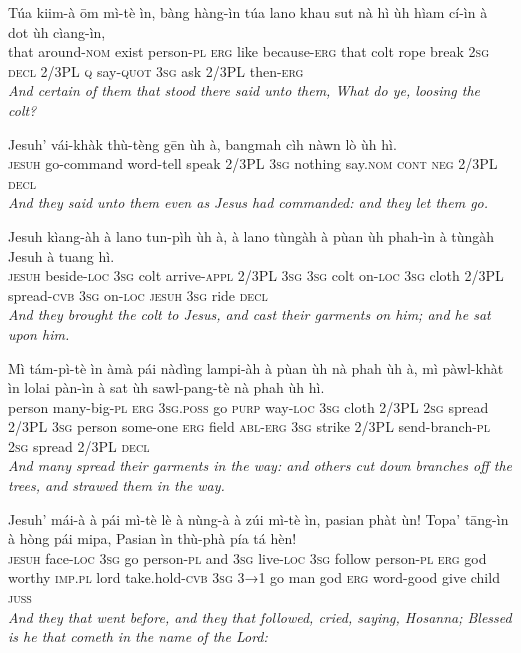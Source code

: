\documentclass[11pt,a4paper]{article}
\begin{document}
\begin{exe}
\gll Túa kiim-à ōm mì-tè ìn, bàng hàng-ìn túa lano khau sut nà hì ùh hìam cí-ìn à dot ùh cìang-ìn, \\
     that around-\textsc{nom} exist person-\textsc{pl} \textsc{erg} like because-\textsc{erg} that colt rope break \textsc{2sg} \textsc{decl} 2/3PL \textsc{q} say-\textsc{quot} \textsc{3sg} ask 2/3PL then-\textsc{erg} \\
\glt \textcolor{kjvcolor}{\textit{And certain of them that stood there said unto them, What do ye, loosing the colt?}}

\gll Jesuh' vái-khàk thù-tèng gēn ùh à, bangmah cìh nàwn lò ùh hì. \\
     \textsc{jesuh} go-command word-tell speak 2/3PL \textsc{3sg} nothing say.\textsc{nom} \textsc{cont} \textsc{neg} 2/3PL \textsc{decl} \\
\glt \textcolor{kjvcolor}{\textit{And they said unto them even as Jesus had commanded: and they let them go.}}

\gll Jesuh kìang-àh à lano tun-pìh ùh à, à lano tùngàh à pùan ùh phah-ìn à tùngàh Jesuh à tuang hì. \\
     \textsc{jesuh} beside-\textsc{loc} \textsc{3sg} colt arrive-\textsc{appl} 2/3PL \textsc{3sg} \textsc{3sg} colt on-\textsc{loc} \textsc{3sg} cloth 2/3PL spread-\textsc{cvb} \textsc{3sg} on-\textsc{loc} \textsc{jesuh} \textsc{3sg} ride \textsc{decl} \\
\glt \textcolor{kjvcolor}{\textit{And they brought the colt to Jesus, and cast their garments on him; and he sat upon him.}}

\gll Mì tám-pì-tè ìn àmà pái nàdìng lampi-àh à pùan ùh nà phah ùh à, mì pàwl-khàt ìn lolai pàn-ìn à sat ùh sawl-pang-tè nà phah ùh hì. \\
     person many-big-\textsc{pl} \textsc{erg} \textsc{3sg}.\textsc{poss} go \textsc{purp} way-\textsc{loc} \textsc{3sg} cloth 2/3PL \textsc{2sg} spread 2/3PL \textsc{3sg} person some-one \textsc{erg} field \textsc{abl}-\textsc{erg} \textsc{3sg} strike 2/3PL send-branch-\textsc{pl} \textsc{2sg} spread 2/3PL \textsc{decl} \\
\glt \textcolor{kjvcolor}{\textit{And many spread their garments in the way: and others cut down branches off the trees, and strawed them in the way.}}

\gll Jesuh' mái-à à pái mì-tè lè à nùng-à à zúi mì-tè ìn, pasian phàt ùn! Topa' tāng-ìn à hòng pái mipa, Pasian ìn thù-phà pía tá hèn! \\
     \textsc{jesuh} face-\textsc{loc} \textsc{3sg} go person-\textsc{pl} and \textsc{3sg} live-\textsc{loc} \textsc{3sg} follow person-\textsc{pl} \textsc{erg} god worthy \textsc{imp}.\textsc{pl} lord take.hold-\textsc{cvb} \textsc{3sg} \textsc{3→1} go man god \textsc{erg} word-good give child \textsc{juss} \\
\glt \textcolor{kjvcolor}{\textit{And they that went before, and they that followed, cried, saying, Hosanna; Blessed is he that cometh in the name of the Lord:}}


\end{exe}
\end{document}
